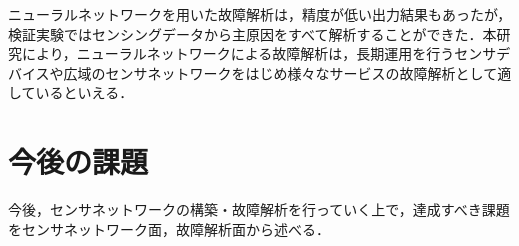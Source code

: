 ニューラルネットワークを用いた故障解析は，精度が低い出力結果もあったが，検証実験ではセンシングデータから主原因をすべて解析することができた．本研究により，ニューラルネットワークによる故障解析は，長期運用を行うセンサデバイスや広域のセンサネットワークをはじめ様々なサービスの故障解析として適しているといえる．

\newpage

\section{今後の課題}
今後，センサネットワークの構築・故障解析を行っていく上で，達成すべき課題をセンサネットワーク面，故障解析面から述べる．

